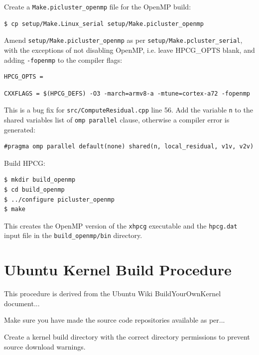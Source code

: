 \documentclass{report}
\begin{document}
Create a \verb|Make.picluster_openmp| file for the OpenMP build:

\lstset{style=type}
\begin{lstlisting}
$ cp setup/Make.Linux_serial setup/Make.picluster_openmp
\end{lstlisting}

Amend \verb|setup/Make.picluster_openmp| as per \verb|setup/Make.pcluster_serial|, with the exceptions of not disabling OpenMP, i.e. leave HPCG\_OPTS blank, and adding \verb|-fopenmp| to the compiler flags:

\lstset{style=listing}
\begin{lstlisting}[numbers=none]
HPCG_OPTS = 
\end{lstlisting}

\lstset{style=listing}
\begin{lstlisting}[numbers=none]
CXXFLAGS = $(HPCG_DEFS) -O3 -march=armv8-a -mtune=cortex-a72 -fopenmp
\end{lstlisting}

This is a bug fix for \verb|src/ComputeResidual.cpp| line 56. Add the variable \verb|n| to the shared variables list of \verb|omp parallel| clause, otherwise a compiler error is generated:

\lstset{style=hack}
\begin{lstlisting}[numbers=none]
#pragma omp parallel default(none) shared(n, local_residual, v1v, v2v)
\end{lstlisting}


Build HPCG:

\lstset{style=type}
\begin{lstlisting}[numbers=none]
$ mkdir build_openmp
$ cd build_openmp
$ ../configure picluster_openmp
$ make
\end{lstlisting}

This creates the OpenMP version of the \verb|xhpcg| executable and the \verb|hpcg.dat| input file in the \verb|build_openmp/bin| directory.


%
%
\chapter{Ubuntu Kernel Build Procedure}

This procedure is derived from the Ubuntu Wiki BuildYourOwnKernel document...

Make sure you have made the source code repositories available as per...

Create a kernel build directory with the correct directory permissions to prevent source download warnings. 
\end{document}
